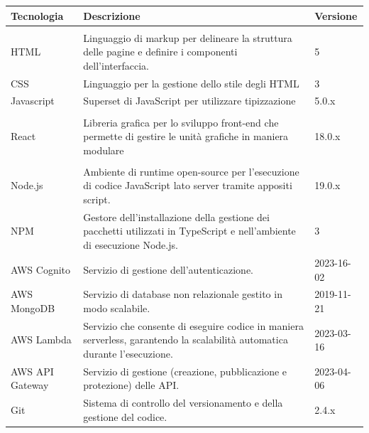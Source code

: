 \documentclass{article}
\begin{document}
{\begin{center}
\begin{tabular}{|P{8em}|P{18em}|P{5em}|}
\hline
{}
Tecnologia & Descrizione & Versione \\
\hline
{}
 \\
\hline
{}
HTML & Linguaggio di markup per delineare la struttura delle pagine e definire i componenti dell'interfaccia. & 5 \\
CSS & Linguaggio per la gestione dello stile degli HTML & 3 \\
Javascript & Superset di JavaScript per utilizzare tipizzazione & 5.0.x \\
\hline
{}
 \\
\hline
{}
React & Libreria grafica per lo sviluppo front-end che permette di gestire le unità grafiche in maniera modulare& 18.0.x \\
\hline
{}
 \\
\hline
{}
Node.js & Ambiente di runtime open-source per l'esecuzione di codice JavaScript lato
server tramite appositi script. & 19.0.x \\
NPM & Gestore dell'installazione della gestione dei pacchetti utilizzati in TypeScript e nell'ambiente di esecuzione Node.js. & 3 \\
AWS Cognito & Servizio di gestione dell'autenticazione. & 2023-16-02\\
AWS MongoDB & Servizio di database non relazionale gestito in modo scalabile. & 2019-11-21\\
AWS Lambda & Servizio che consente di eseguire codice in maniera serverless, garantendo la scalabilità automatica durante l'esecuzione. & 2023-03-16 \\
AWS API Gateway & Servizio di gestione (creazione, pubblicazione e protezione) delle API. & 2023-04-06\\
Git & Sistema di controllo del versionamento e della gestione del codice. & 2.4.x\\
\hline
\end{tabular}
\label{tab:teccod}
\end{center}


}
\end{document}

